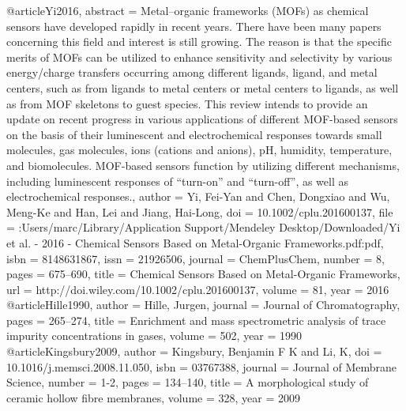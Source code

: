 @article{Yi2016,
abstract = {Metal–organic frameworks (MOFs) as chemical sensors have developed rapidly in recent years. There have been many papers concerning this field and interest is still growing. The reason is that the specific merits of MOFs can be utilized to enhance sensitivity and selectivity by various energy/charge transfers occurring among different ligands, ligand, and metal centers, such as from ligands to metal centers or metal centers to ligands, as well as from MOF skeletons to guest species. This review intends to provide an update on recent progress in various applications of different MOF-based sensors on the basis of their luminescent and electrochemical responses towards small molecules, gas molecules, ions (cations and anions), pH, humidity, temperature, and biomolecules. MOF-based sensors function by utilizing different mechanisms, including luminescent responses of “turn-on” and “turn-off”, as well as electrochemical responses.},
author = {Yi, Fei-Yan and Chen, Dongxiao and Wu, Meng-Ke and Han, Lei and Jiang, Hai-Long},
doi = {10.1002/cplu.201600137},
file = {:Users/marc/Library/Application Support/Mendeley Desktop/Downloaded/Yi et al. - 2016 - Chemical Sensors Based on Metal-Organic Frameworks.pdf:pdf},
isbn = {8148631867},
issn = {21926506},
journal = {ChemPlusChem},
number = {8},
pages = {675--690},
title = {{Chemical Sensors Based on Metal-Organic Frameworks}},
url = {http://doi.wiley.com/10.1002/cplu.201600137},
volume = {81},
year = {2016}
}
@article{Hille1990,
author = {Hille, Jurgen},
journal = {Journal of Chromatography},
pages = {265--274},
title = {{Enrichment and mass spectrometric analysis of trace impurity concentrations in gases}},
volume = {502},
year = {1990}
}
@article{Kingsbury2009,
author = {Kingsbury, Benjamin F K and Li, K},
doi = {10.1016/j.memsci.2008.11.050},
isbn = {03767388},
journal = {Journal of Membrane Science},
number = {1-2},
pages = {134--140},
title = {{A morphological study of ceramic hollow fibre membranes}},
volume = {328},
year = {2009}
}
